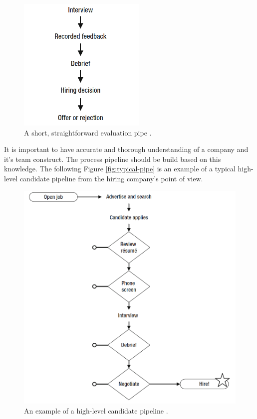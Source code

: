 \documentclass[11pt,a4paper,oneside,article]{memoir}
\begin{document}
\pagebreak

\begin{figure}[h]
  \centering
  \includegraphics[width=6.1cm]{short_pipe}
  \caption{A short, straightforward evaluation pipe \cite[p.~42]{mcculler:book}.}
  \label{fig:short-pipe}
\end{figure}

It is important to have accurate and thorough understanding of a company and it's team construct. The process pipeline should be build based on this knowledge. The following Figure \vref{fig:typical-pipe} is an example of a typical high-level candidate pipeline from the hiring company's point of view.

\begin{figure}[h]
  \centering
  \includegraphics[width=12.2cm]{typical_pipe}
  \caption{An example of a high-level candidate pipeline \cite[p.~28]{mcculler:book}.}
  \label{fig:typical-pipe}
\end{figure}
\end{document}
